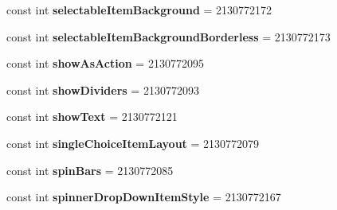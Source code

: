 \begin{DoxyCompactItemize}
\item 
\hypertarget{classClient_1_1Droid_1_1Resource_1_1Attribute_aa1dbef5f65288675cd638353b524d900}{}const int {\bfseries selectable\+Item\+Background} = 2130772172\label{classClient_1_1Droid_1_1Resource_1_1Attribute_aa1dbef5f65288675cd638353b524d900}

\item 
\hypertarget{classClient_1_1Droid_1_1Resource_1_1Attribute_a2a008de728e9f513a0e5d982d13db8b6}{}const int {\bfseries selectable\+Item\+Background\+Borderless} = 2130772173\label{classClient_1_1Droid_1_1Resource_1_1Attribute_a2a008de728e9f513a0e5d982d13db8b6}

\item 
\hypertarget{classClient_1_1Droid_1_1Resource_1_1Attribute_a4d3be8c0f482619a2b2d372428fa5792}{}const int {\bfseries show\+As\+Action} = 2130772095\label{classClient_1_1Droid_1_1Resource_1_1Attribute_a4d3be8c0f482619a2b2d372428fa5792}

\item 
\hypertarget{classClient_1_1Droid_1_1Resource_1_1Attribute_a4f372b0b9b5cecbf6a28e3a6080576d2}{}const int {\bfseries show\+Dividers} = 2130772093\label{classClient_1_1Droid_1_1Resource_1_1Attribute_a4f372b0b9b5cecbf6a28e3a6080576d2}

\item 
\hypertarget{classClient_1_1Droid_1_1Resource_1_1Attribute_a71c950428358aa3cf114da95679271a5}{}const int {\bfseries show\+Text} = 2130772121\label{classClient_1_1Droid_1_1Resource_1_1Attribute_a71c950428358aa3cf114da95679271a5}

\item 
\hypertarget{classClient_1_1Droid_1_1Resource_1_1Attribute_a4e7f93fa7381aa89ae9008017fd51306}{}const int {\bfseries single\+Choice\+Item\+Layout} = 2130772079\label{classClient_1_1Droid_1_1Resource_1_1Attribute_a4e7f93fa7381aa89ae9008017fd51306}

\item 
\hypertarget{classClient_1_1Droid_1_1Resource_1_1Attribute_a7da30ac2a620538fe8544ac31f13aee3}{}const int {\bfseries spin\+Bars} = 2130772085\label{classClient_1_1Droid_1_1Resource_1_1Attribute_a7da30ac2a620538fe8544ac31f13aee3}

\item 
\hypertarget{classClient_1_1Droid_1_1Resource_1_1Attribute_ae4ad452673f900a2a9d82d06c2c4d1ea}{}const int {\bfseries spinner\+Drop\+Down\+Item\+Style} = 2130772167\label{classClient_1_1Droid_1_1Resource_1_1Attribute_ae4ad452673f900a2a9d82d06c2c4d1ea}


\end{DoxyCompactItemize}
